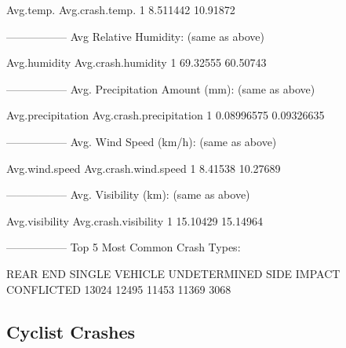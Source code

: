 \documentclass[11pt, a4paper]{article}
\begin{document}
\begin{Schunk}
\begin{Soutput}
\end{Soutput}
\begin{Soutput}
  Avg.temp. Avg.crash.temp.
1  8.511442        10.91872
\end{Soutput}
\begin{Soutput}
-----------------
Avg Relative Humidity: (same as above)
\end{Soutput}
\begin{Soutput}
  Avg.humidity Avg.crash.humidity
1     69.32555           60.50743
\end{Soutput}
\begin{Soutput}
-----------------
Avg. Precipitation Amount (mm): (same as above)
\end{Soutput}
\begin{Soutput}
  Avg.precipitation Avg.crash.precipitation
1        0.08996575              0.09326635
\end{Soutput}
\begin{Soutput}
-----------------
Avg. Wind Speed (km/h): (same as above)
\end{Soutput}
\begin{Soutput}
  Avg.wind.speed Avg.crash.wind.speed
1        8.41538             10.27689
\end{Soutput}
\begin{Soutput}
-----------------
Avg. Visibility (km): (same as above)
\end{Soutput}
\begin{Soutput}
  Avg.visibility Avg.crash.visibility
1       15.10429             15.14964
\end{Soutput}
\begin{Soutput}
-----------------
Top 5 Most Common Crash Types:
\end{Soutput}
\begin{Soutput}
      REAR END SINGLE VEHICLE   UNDETERMINED    SIDE IMPACT     CONFLICTED 
         13024          12495          11453          11369           3068 
\end{Soutput}
\end{Schunk}




\pagebreak
\subsection{Cyclist Crashes}
\end{document}
